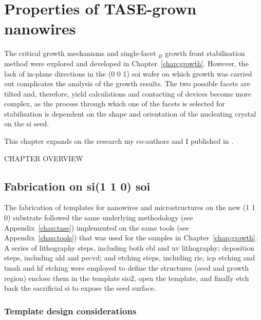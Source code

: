 \chapter{Properties of TASE-grown nanowires}
\label{chap:properties}

The critical growth mechanisms and single-facet \(_B\) growth front stabilisation method were explored and developed in Chapter~\ref{chap:growth}. However, the lack of in-plane  directions in the \hkl(0 0 1) \acf{soi} wafer on which growth was carried out complicates the analysis of the growth results. The two possible  facets are tilted and, therefore, yield calculations and contacting of devices become more complex, as the process through which one of the facets is selected for stabilisation is dependent on the shape and orientation of the nucleating crystal on the \acs{si} seed.

This chapter expands on the research my co-authors and I published in \cite{Brugnolotto2023, Brugnolotto2023_2}. 

CHAPTER OVERVIEW

\section{\texorpdfstring{Fabrication on \acs{si}\hkl(1 1 0) \acs{soi}}{Fabrication on Si(110) SOI}}

The fabrication of templates for nanowires and microstructures on the new \hkl(1 1 0) substrate followed the same underlying methodology (see Appendix~\ref{chap:tase}) implemented on the same tools (see Appendix~\ref{chap:tools}) that was used for the samples in Chapter~\ref{chap:growth}. A series of lithography steps, including both \acf{ebl} and uv lithography; deposition steps, including \acf{ald} and \acf{pecvd}; and etching steps, including \acf{rie}, \acf{icp} etching and \acf{tmah} and \acf{hf} etching were employed to define the structures (seed and growth region) enclose them in the template \acs{sio2}, open the template, and finally etch back the sacrificial \acs{si} to expose the seed surface.

\subsection{Template design considerations}


